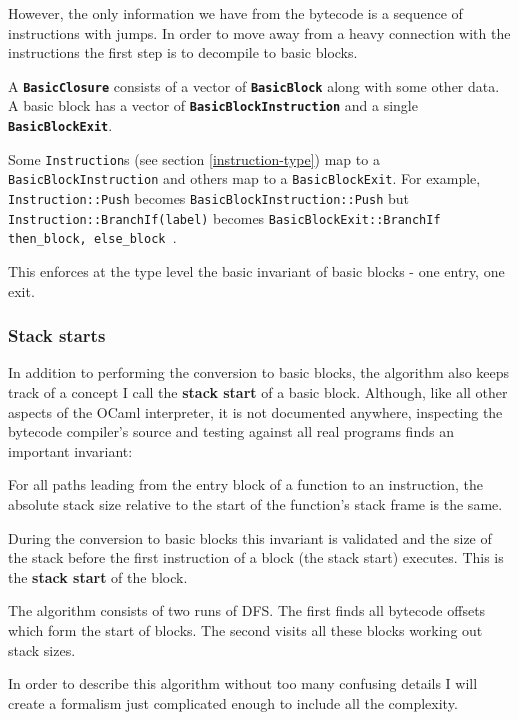 However, the only information we have from the bytecode is a sequence of instructions with jumps.
In order to move away from a heavy connection with the instructions the first step is to decompile
to basic blocks.


A \textbf{\texttt{BasicClosure}} consists of a vector of \textbf{\texttt{BasicBlock}} along with
some other data. A basic block has a vector of \textbf{\texttt{BasicBlockInstruction}} and a single
\textbf{\texttt{BasicBlockExit}}.

Some \texttt{Instruction}s (see section \ref{instruction-type}) map to a
\texttt{BasicBlockInstruction} and others map to a \texttt{BasicBlockExit}. For example,
\texttt{Instruction::Push} becomes \texttt{BasicBlockInstruction::Push} but
\texttt{Instruction::BranchIf(label)} becomes \texttt{BasicBlockExit::BranchIf { then\_block,
else\_block }}.

This enforces at the type level the basic invariant of basic blocks - one entry, one exit.

\subsubsection{Stack starts}

In addition to performing the conversion to basic blocks, the algorithm also keeps track of a
concept I call the \textbf{stack start} of a basic block. Although, like all other aspects of the
OCaml interpreter, it is not documented anywhere, inspecting the bytecode compiler's source and
testing against all real programs finds an important invariant:

For all paths leading from the entry block of a function to an instruction, the absolute stack size
relative to the start of the function's stack frame is the same.

During the conversion to basic blocks this invariant is validated and the size of the stack before
the first instruction of a block (the stack start) executes. This is the \textbf{stack start} of
the block.


The algorithm consists of two runs of DFS. The first finds all bytecode offsets which form the
start of blocks. The second visits all these blocks working out stack sizes.

In order to describe this algorithm without too many confusing details I will create a formalism
just complicated enough to include all the complexity.

